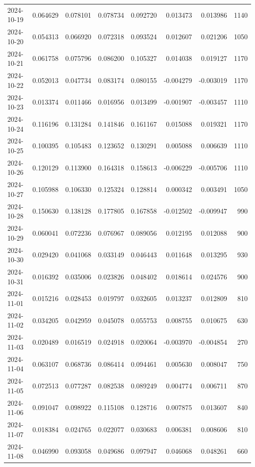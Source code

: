 \begin{tabular}{lrrrrrrr}
2024-10-19 & 0.064629 & 0.078101 & 0.078734 & 0.092720 & 0.013473 & 0.013986 & 1140 \\
2024-10-20 & 0.054313 & 0.066920 & 0.072318 & 0.093524 & 0.012607 & 0.021206 & 1050 \\
2024-10-21 & 0.061758 & 0.075796 & 0.086200 & 0.105327 & 0.014038 & 0.019127 & 1170 \\
2024-10-22 & 0.052013 & 0.047734 & 0.083174 & 0.080155 & -0.004279 & -0.003019 & 1170 \\
2024-10-23 & 0.013374 & 0.011466 & 0.016956 & 0.013499 & -0.001907 & -0.003457 & 1110 \\
2024-10-24 & 0.116196 & 0.131284 & 0.141846 & 0.161167 & 0.015088 & 0.019321 & 1170 \\
2024-10-25 & 0.100395 & 0.105483 & 0.123652 & 0.130291 & 0.005088 & 0.006639 & 1110 \\
2024-10-26 & 0.120129 & 0.113900 & 0.164318 & 0.158613 & -0.006229 & -0.005706 & 1110 \\
2024-10-27 & 0.105988 & 0.106330 & 0.125324 & 0.128814 & 0.000342 & 0.003491 & 1050 \\
2024-10-28 & 0.150630 & 0.138128 & 0.177805 & 0.167858 & -0.012502 & -0.009947 & 990 \\
2024-10-29 & 0.060041 & 0.072236 & 0.076967 & 0.089056 & 0.012195 & 0.012088 & 900 \\
2024-10-30 & 0.029420 & 0.041068 & 0.033149 & 0.046443 & 0.011648 & 0.013295 & 930 \\
2024-10-31 & 0.016392 & 0.035006 & 0.023826 & 0.048402 & 0.018614 & 0.024576 & 900 \\
2024-11-01 & 0.015216 & 0.028453 & 0.019797 & 0.032605 & 0.013237 & 0.012809 & 810 \\
2024-11-02 & 0.034205 & 0.042959 & 0.045078 & 0.055753 & 0.008755 & 0.010675 & 630 \\
2024-11-03 & 0.020489 & 0.016519 & 0.024918 & 0.020064 & -0.003970 & -0.004854 & 270 \\
2024-11-04 & 0.063107 & 0.068736 & 0.086414 & 0.094461 & 0.005630 & 0.008047 & 750 \\
2024-11-05 & 0.072513 & 0.077287 & 0.082538 & 0.089249 & 0.004774 & 0.006711 & 870 \\
2024-11-06 & 0.091047 & 0.098922 & 0.115108 & 0.128716 & 0.007875 & 0.013607 & 840 \\
2024-11-07 & 0.018384 & 0.024765 & 0.022077 & 0.030683 & 0.006381 & 0.008606 & 810 \\
2024-11-08 & 0.046990 & 0.093058 & 0.049686 & 0.097947 & 0.046068 & 0.048261 & 660 \\

\end{tabular}
